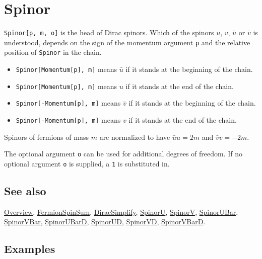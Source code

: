 \documentclass[../FeynCalcManual.tex]{subfiles}
\begin{document}
\hypertarget{spinor}{%
\section{Spinor}\label{spinor}}

\texttt{Spinor[\allowbreak{}p,\ \allowbreak{}m,\ \allowbreak{}o]} is the
head of Dirac spinors. Which of the spinors \(u\), \(v\), \(\bar{u}\) or
\(\bar{v}\) is understood, depends on the sign of the momentum argument
\texttt{p} and the relative position of \texttt{Spinor} in the chain.

\begin{itemize}
\item
  \texttt{Spinor[\allowbreak{}Momentum[\allowbreak{}p],\ \allowbreak{}m]}
  means \(\bar{u}\) if it stands at the beginning of the chain.
\item
  \texttt{Spinor[\allowbreak{}Momentum[\allowbreak{}p],\ \allowbreak{}m]}
  means \(u\) if it stands at the end of the chain.
\item
  \texttt{Spinor[\allowbreak{}-Momentum[\allowbreak{}p],\ \allowbreak{}m]}
  means \(\bar{v}\) if it stands at the beginning of the chain.
\item
  \texttt{Spinor[\allowbreak{}-Momentum[\allowbreak{}p],\ \allowbreak{}m]}
  means \(v\) if it stands at the end of the chain.
\end{itemize}

Spinors of fermions of mass \(m\) are normalized to have
\(\bar{u} u=2 m\) and \(\bar{v} v=-2 m\).

The optional argument \texttt{o} can be used for additional degrees of
freedom. If no optional argument \texttt{o} is supplied, a \texttt{1} is
substituted in.

\subsection{See also}

\hyperlink{toc}{Overview}, \hyperlink{fermionspinsum}{FermionSpinSum},
\hyperlink{diracsimplify}{DiracSimplify}, \hyperlink{spinoru}{SpinorU},
\hyperlink{spinorv}{SpinorV}, \hyperlink{spinorubar}{SpinorUBar},
\hyperlink{spinorvbar}{SpinorVBar},
\hyperlink{spinorubard}{SpinorUBarD}, \hyperlink{spinorud}{SpinorUD},
\hyperlink{spinorvd}{SpinorVD}, \hyperlink{spinorvbard}{SpinorVBarD}.

\subsection{Examples}
\end{document}
